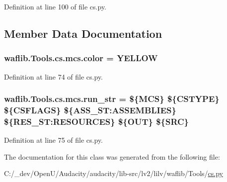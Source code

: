 Definition at line 100 of file cs.\+py.



\subsection{Member Data Documentation}
\subsubsection[{\texorpdfstring{color}{color}}]{ waflib.\+Tools.\+cs.\+mcs.\+color = \textquotesingle{}Y\+E\+L\+L\+OW\textquotesingle{}\hspace{0.3cm}{\ttfamily [static]}}\hypertarget{classwaflib_1_1_tools_1_1cs_1_1mcs_a9eafa1a8c7ec859637abe49f13ad52fb}{}\label{classwaflib_1_1_tools_1_1cs_1_1mcs_a9eafa1a8c7ec859637abe49f13ad52fb}


Definition at line 74 of file cs.\+py.

\subsubsection[{\texorpdfstring{run\+\_\+str}{run_str}}]{ waflib.\+Tools.\+cs.\+mcs.\+run\+\_\+str = \textquotesingle{}\$\{M\+CS\} \$\{C\+S\+T\+Y\+PE\} \$\{C\+S\+F\+L\+A\+GS\} \$\{A\+S\+S\+\_\+\+S\+T\+:\+A\+S\+S\+E\+M\+B\+L\+I\+ES\} \$\{R\+E\+S\+\_\+\+S\+T\+:\+R\+E\+S\+O\+U\+R\+C\+ES\} \$\{O\+UT\} \$\{S\+RC\}\textquotesingle{}\hspace{0.3cm}{\ttfamily [static]}}\hypertarget{classwaflib_1_1_tools_1_1cs_1_1mcs_a7aa0df137ffc5c73291d49976b99e25b}{}\label{classwaflib_1_1_tools_1_1cs_1_1mcs_a7aa0df137ffc5c73291d49976b99e25b}


Definition at line 75 of file cs.\+py.



The documentation for this class was generated from the following file\+:\begin{DoxyCompactItemize}
\item 
C\+:/\+\_\+dev/\+Open\+U/\+Audacity/audacity/lib-\/src/lv2/lilv/waflib/\+Tools/\hyperlink{lilv_2waflib_2_tools_2cs_8py}{cs.\+py}\end{DoxyCompactItemize}
